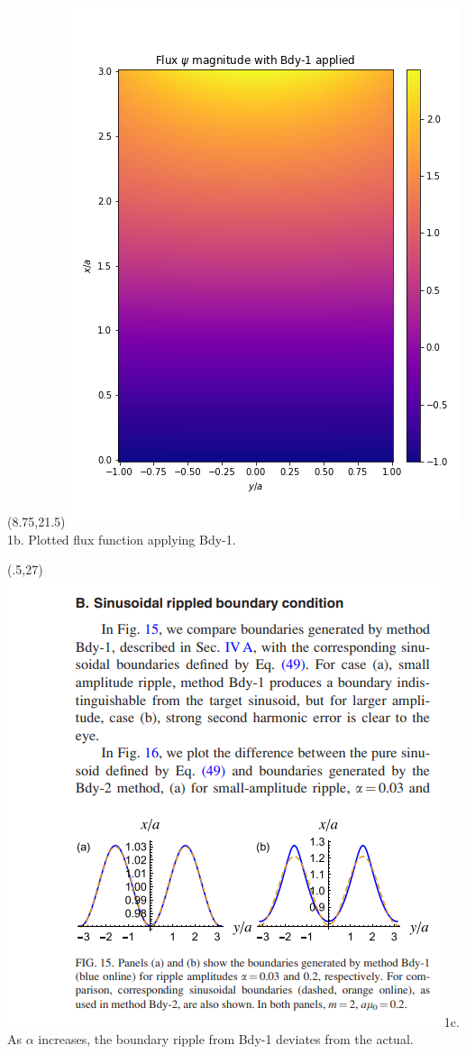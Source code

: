 \documentclass{beamer}
\begin{document}
\begin{frame}[t]
\begin{textblock}{15}(8.75,21.5)
    \includegraphics[scale=1.2]{bdy-1_general-solution.png} 
    \newline
    1b. Plotted flux function applying Bdy-1. \cite{dewar2017}
\end{textblock}

\begin{textblock}{15}(.5,27)
    \includegraphics[scale=1]{dewar-bdy1-error.png} 
    \newline
    1c. As $\alpha$ increases, the boundary ripple from Bdy-1 deviates from the actual. \cite{dewar2017}
\end{textblock}



\end{frame}
\end{document}
